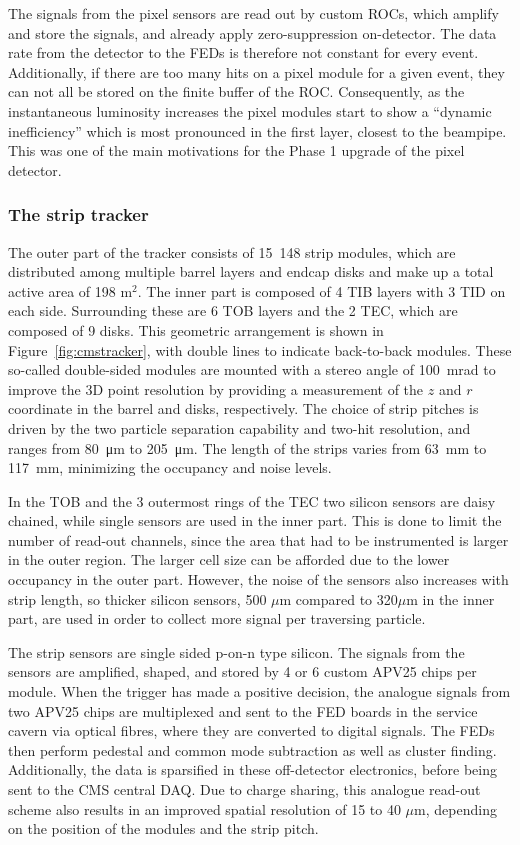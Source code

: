 The signals from the pixel sensors are read out by custom \acp{ROC}, which amplify and store the signals, and already apply zero-suppression on-detector. The data rate from the detector to the \acp{FED} is therefore not constant for every event. Additionally, if there are too many hits on a pixel module for a given event, they can not all be stored on the finite buffer of the \ac{ROC}. Consequently, as the instantaneous luminosity increases the pixel modules start to show a ``dynamic inefficiency''  which is most pronounced in the first layer, closest to the beampipe. This was one of the main motivations for the Phase 1 upgrade of the pixel detector.

\subsubsection{The strip tracker}

The outer part of the tracker consists of 15~148 strip modules, which are distributed among multiple barrel layers and endcap disks and make up a total active area of 198 m$^2$. The inner part is composed of 4 \ac{TIB} layers with 3 \ac{TID} on each side. Surrounding these are 6 \ac{TOB} layers and the 2 \ac{TEC}, which are composed of 9 disks. This geometric arrangement is shown in Figure~\ref{fig:cmstracker}, with double lines to indicate back-to-back modules. These so-called double-sided modules are mounted with a stereo angle of 100~mrad to improve the 3D point resolution by providing a measurement of the $z$ and $r$ coordinate in the barrel and disks, respectively. The choice of strip pitches is driven by the two particle separation capability and two-hit resolution, and ranges from \SI{80}{\micro m} to \SI{205}{\micro m}. The length of the strips varies from \SI{63}{mm} to \SI{117}{mm}, minimizing the occupancy and noise levels.

In the \ac{TOB} and the 3 outermost rings of the \ac{TEC} two silicon sensors are daisy chained, while single sensors are used in the inner part. This is done to limit the number of read-out channels, since the area that had to be instrumented is larger in the outer region. The larger cell size can be afforded  due to the lower occupancy in the outer part. However, the noise of the sensors also increases with strip length, so thicker silicon sensors, 500 $\mu$m compared to 320$\mu$m in the inner part, are used in order to collect more signal per traversing particle.

The strip sensors are single sided p-on-n type silicon. The signals from the sensors are amplified, shaped, and stored by 4 or 6 custom APV25 chips per module. When the trigger has made a positive decision, the analogue signals from two APV25 chips are multiplexed and sent to the \ac{FED} boards in the service cavern via optical fibres, where they are converted to digital signals. The \acp{FED} then perform pedestal and common mode subtraction as well as cluster finding. Additionally, the data is sparsified in these off-detector electronics, before being sent to the CMS central \ac{DAQ}. Due to charge sharing, this analogue read-out scheme also results in an improved spatial resolution of 15 to 40 $\mu$m, depending on the position of the modules and the strip pitch. 

